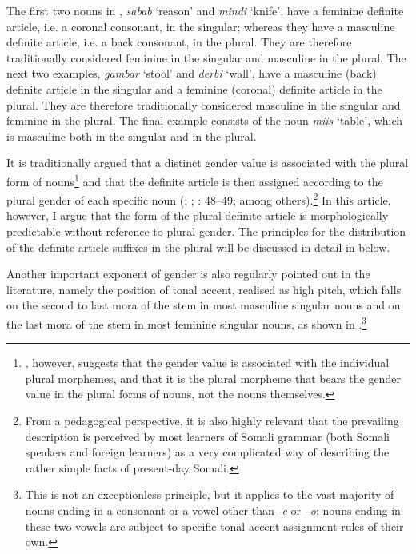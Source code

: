 \documentclass[output=paper]{langsci/langscibook}
\begin{document}
The first two nouns in , \textit{sabab }‘reason’ and \textit{mindi} ‘knife’, have a feminine definite article, i.e. a coronal consonant, in the singular; whereas they have a masculine definite article, i.e. a back consonant, in the plural. They are therefore traditionally considered feminine in the singular and masculine in the plural. The next two examples, \textit{gambar} ‘stool’ and \textit{derbi} ‘wall’, have a masculine (back) definite article in the singular and a feminine (coronal) definite article in the plural. They are therefore traditionally considered masculine in the singular and feminine in the plural. The final example consists of the noun \textit{miis} ‘table’, which is masculine both in the singular and in the plural.

It is traditionally argued that a distinct gender value is associated with the plural form of nouns\footnote{\citet{Lecarme2002}, however, suggests that the gender value is associated with the individual plural morphemes, and that it is the plural morpheme that bears the gender value in the plural forms of nouns, not the nouns themselves.} and that the definite article is then assigned according to the plural gender of each specific noun (\citealt{ElSolamiMewis1988}; \citealt[54--55]{Saeed1999}; \citealt[48--49]{Berchem2012}: 48--49; among others).\footnote{From a pedagogical perspective, it is also highly relevant that the prevailing description is perceived by most learners of Somali grammar (both Somali speakers and foreign learners) as a very complicated way of describing the rather simple facts of present-day Somali.}  In this article, however, I argue that the form of the plural definite article is morphologically predictable without reference to plural gender. The principles for the distribution of the definite article suffixes in the plural will be discussed in detail in  below.

Another important exponent of gender is also regularly pointed out in the literature, namely the position of tonal accent, realised as high pitch, which falls on the second to last mora of the stem in most masculine singular nouns and on the last mora of the stem in most feminine singular nouns, as shown in .\footnote{This is not an exceptionless principle, but it applies to the vast majority of nouns ending in a consonant or a vowel other than \textit{{}-e} or \textit{–o}; nouns ending in these two vowels are subject to specific tonal accent assignment rules of their own.}
 
\end{document}
